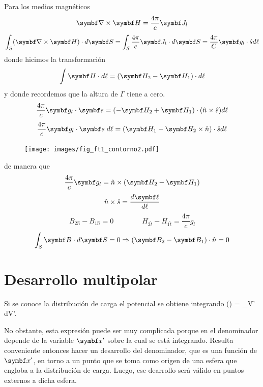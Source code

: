 \documentclass[10pt,oneside]{CBFT_book}
\begin{document}
Para los medios magnéticos
\[
	\rotorm{H} = \frac{4 \pi}{c} \vb{J}_l
\]
\[
	\int_S (\rotorm{H}) \cdot d\vb{S} = \int_S \frac{4 \pi}{c} \vb{J}_l \cdot d\vb{S} = 
	\frac{4 \pi}{C} \vb{g}_l\cdot \hat{s} d\ell
\]
donde hicimos la transformación
\[
	\int \vb{H}\cdot d\ell = (\vb{H}_2-\vb{H}_1)\cdot d\ell
\]
y donde recordemos que la altura de $\Gamma$ tiene a cero.
\[
	\frac{4 \pi}{c} \vb{g}_l \cdot \vb{s} = ( -\vb{H}_2 + \vb{H}_1 )\cdot( \hat{n} \times \hat{s} ) d\ell
\]
\[
	\frac{4 \pi}{c} \vb{g}_l \cdot \vb{s} \; d\ell = (\vb{H}_1 -\vb{H}_2 \times \hat{n})\cdot \hat{s} 
d\ell
\]

\begin{figure}[htb]
	\begin{center}
	\texttt{[image: images/fig\_ft1\_contorno2.pdf]}	 
	\end{center}
	\caption{}
\end{figure} 

de manera que 
\[
	\frac{4 \pi}{c} \vb{g}_l = \hat{n} \times ( \vb{H}_2 - \vb{H}_1 )
\]
\[
	\hat{n}\times\hat{s} = \frac{d\vb{\ell}}{d\ell} 
\]
\[
	B_{2\hat{n}} - B_{1\hat{n}} = 0 \qquad \qquad H_{2\hat{t}} - H_{1\hat{t}} = \frac{4 \pi}{c} g_l
\]
\[
	\int_S \vb{B}\cdot d\vb{S} = 0 \Rightarrow (\vb{B}_2 - \vb{B}_1 )\cdot\hat{n} = 0
\]

\section{Desarrollo multipolar}

Si se conoce la distribución de carga el potencial se obtiene integrando
\be
	\phi() = \int_{V'}  \; dV'.
	\label{integral_potencial}
\ee

No obstante, esta expresión puede ser muy complicada porque en el denominador depende de la variable 
$\vbx'$ sobre la cual se está integrando. 
Resulta conveniente entonces hacer un desarrollo del denominador, que es una función de $\vbx'$, en
torno a un punto que se toma como origen de una esfera que engloba a la distribución de carga.
Luego, ese dearrollo será válido en puntos externos a dicha esfera.

\end{document}

